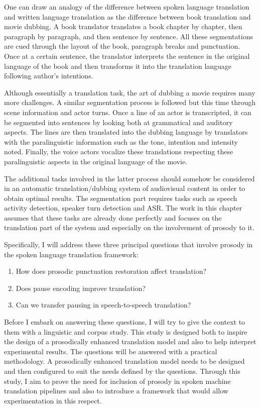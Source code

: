One can draw an analogy of the difference between spoken language translation and written language translation as the difference between book translation and movie dubbing. A book translator translates a book chapter by chapter, then paragraph by paragraph, and then sentence by sentence. All these segmentations are cued through the layout of the book, paragraph breaks and punctuation. Once at a certain sentence, the translator interprets the sentence in the original language of the book and then transforms it into the translation language following author's intentions. 

Although essentially a translation task, the art of dubbing a movie requires many more challenges. A similar segmentation process is followed but this time through scene information and actor turns. Once a line of an actor is transcripted, it can be segmented into sentences by looking both at grammatical and auditory aspects. The lines are then translated into the dubbing language by translators with the paralinguistic information such as the tone, intention and intensity noted. Finally, the voice actors vocalize these translations respecting these paralinguistic aspects in the original language of the movie. 

The additional tasks involved in the latter process should somehow be considered in an automatic translation/dubbing system of audiovisual content in order to obtain optimal results. The segmentation part requires tasks such as speech activity detection, speaker turn detection and ASR. The work in this chapter assumes that these tasks are already done perfectly and focuses on the translation part of the system and especially on the involvement of prosody to it. 

Specifically, I will address these three principal questions that involve prosody in the spoken language translation framework:

\begin{enumerate}
    \item How does prosodic punctuation restoration affect translation?
    \item Does pause encoding improve translation?
    \item Can we transfer pausing in speech-to-speech translation?
\end{enumerate}

Before I embark on answering these questions, I will try to give the context to them with a linguistic and corpus study. This study is designed both to inspire the design of a prosodically enhanced translation model and also to help interpret experimental results. The questions will be answered with a practical methodology. A prosodically enhanced translation model needs to be designed and then configured to suit the needs defined by the questions. Through this study, I aim to prove the need for inclusion of prosody in spoken machine translation pipelines and also to introduce a framework that would allow experimentation in this respect. 

